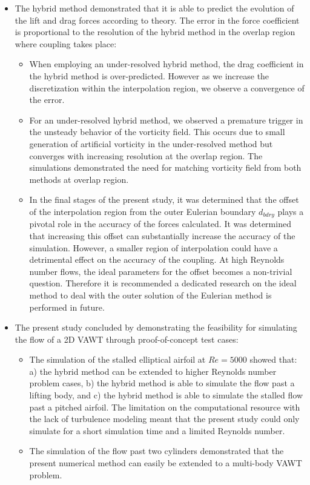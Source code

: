 \begin{itemize}
\item The hybrid method demonstrated that it is able to predict the evolution of the lift and drag forces according to theory. The error in the force coefficient is proportional to the resolution of the hybrid method in the overlap region where coupling takes place:

	\begin{itemize}
	\item When employing an under-resolved hybrid method, the drag coefficient in the hybrid method is over-predicted. However as we increase the discretization within the interpolation region, we observe a convergence of the error.
	\item For an under-resolved hybrid method, we observed a premature trigger in the unsteady behavior of the vorticity field. This occurs due to small generation of artificial vorticity in the under-resolved method but converges with increasing resolution at the overlap region. The simulations demonstrated the need for matching vorticity field from both methods at overlap region.
	\item In the final stages of the present study, it was determined that the offset of the interpolation region from the outer Eulerian boundary $d_{bdry}$ plays a pivotal role in the accuracy of the forces calculated. It was determined that increasing this offset can substantially increase the accuracy of the simulation. However, a smaller region of interpolation could have a detrimental effect on the accuracy of the coupling. At high Reynolds number flows, the ideal parameters for the offset becomes a non-trivial question. Therefore it is recommended a dedicated research on the ideal method to deal with the outer solution of the Eulerian method is performed in future.
	\end{itemize}
	
\item The present study concluded by demonstrating the feasibility for simulating the flow of a 2D VAWT through proof-of-concept test cases:

	\begin{itemize}
	\item The simulation of the stalled elliptical airfoil at $Re=5000$ showed that: a) the hybrid method can be extended to higher Reynolds number problem cases, b) the hybrid method is able to simulate the flow past a lifting body, and c) the hybrid method is able to simulate the stalled flow past a pitched airfoil. The limitation on the computational resource with the lack of turbulence modeling meant that the present study could only simulate for a short simulation time and a limited Reynolds number.
	\item The simulation of the flow past two cylinders demonstrated that the present numerical method can easily be extended to a multi-body VAWT problem.
	\end{itemize}

\end{itemize}


